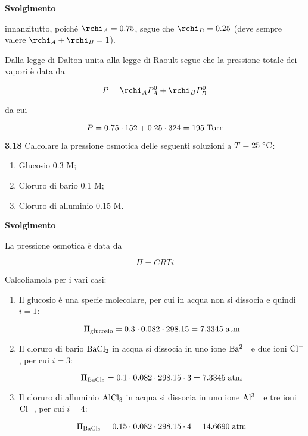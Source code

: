 \vspace{0.2cm}\large\textbf{Svolgimento}\normalsize

\vspace{0.2cm}innanzitutto, poiché $\rchi_A=0.75$, segue che $\rchi_B=0.25$ (deve sempre valere $\rchi_A + \rchi_B =1$).

Dalla legge di Dalton unita alla legge di Raoult segue che la pressione totale dei vapori è data da

$$P=\rchi_A P_A^0 + \rchi_B P_B^0$$

da cui

$$P=0.75 \cdot 152 + 0.25 \cdot 324=195 \; \rm Torr$$

\vspace{0.2cm}\textbf{3.18} Calcolare la pressione osmotica delle seguenti soluzioni a $T=25 \; \rm ^{\circ}C$:

\begin{enumerate}
    \item Glucosio 0.3 M;
    \item Cloruro di bario 0.1 M;
    \item Cloruro di alluminio 0.15 M.
\end{enumerate}

\large\textbf{Svolgimento}\normalsize

\vspace{0.2cm}La pressione osmotica è data da

$$\Pi=CRTi$$

Calcoliamola per i vari casi:

\begin{enumerate}
    \item Il glucosio è una specie molecolare, per cui in acqua non si dissocia e quindi $i=1$:
    
    $$\Pi_{\rm glucosio}
    =0.3 \cdot 0.082 \cdot 298.15
    =7.3345 \; \rm atm$$

    \item Il cloruro di bario $\rm BaCl_2$ in acqua si dissocia in uno ione $\rm Ba^{2+}$ e due ioni $\rm Cl^-$, per cui $i=3$:
    
    $$\Pi_{\rm BaCl_2}
    =0.1 \cdot 0.082 \cdot 298.15 \cdot 3
    =7.3345 \; \rm atm$$

    \item Il cloruro di alluminio $\rm AlCl_3$ in acqua si dissocia in uno ione $\rm Al^{3+}$ e tre ioni $\rm Cl^-$, per cui $i=4$:
    
    $$\Pi_{\rm BaCl_2}
    =0.15 \cdot 0.082 \cdot 298.15 \cdot 4
    =14.6690 \; \rm atm$$
\end{enumerate}

